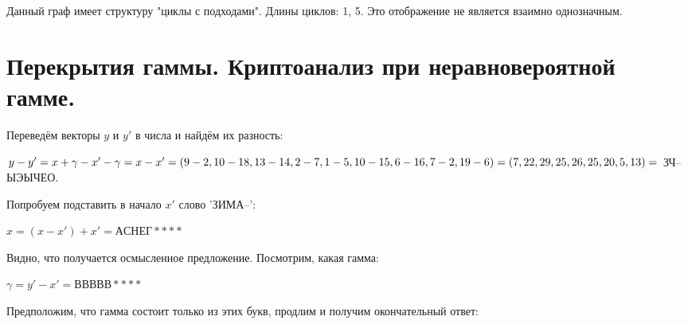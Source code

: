 \documentclass[letterpaper,11pt,openany]{book}
\begin{document}
\noindent Данный граф имеет структуру "циклы с подходами". Длины циклов: 1, 5. Это отображение не является взаимно однозначным.

\medskip

\section{Перекрытия гаммы. Криптоанализ при неравновероятной гамме.}


Переведём векторы $y$ и $y'$ в числа и найдём их разность:

\noindent $y - y' = x + \gamma - x' - \gamma = x - x' = (9 - 2, 10 - 18, 13 - 14, 2 - 7, 1 - 5, 10 - 15, \\ 6 - 16, 7 - 2, 19 - 6) = (7, 22, 29, 25, 26, 25, 20, 5, 13) = $ ЗЧ--ЫЭЫЧЕО.

Попробуем подставить в начало $x'$ слово 'ЗИМА--':

\noindent $x = (x - x') + x' = АСНЕГ * * * *$

Видно, что получается осмысленное предложение. Посмотрим, какая гамма:

$\gamma = y' - x' = ВВВВВ ****$

Предположим, что гамма состоит только из этих букв, продлим и получим окончательный ответ:
\end{document}
